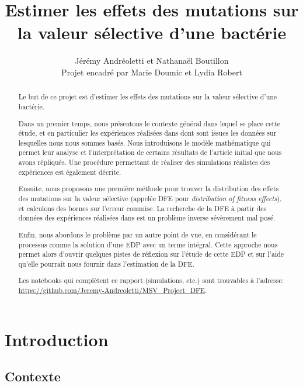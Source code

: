 \documentclass[12pt]{article}
\title{Estimer les effets des mutations sur la valeur sélective d'une bactérie}
\author{Jérémy Andréoletti et Nathanaël Boutillon\\Projet encadré par Marie Doumic et Lydia Robert}
\newcounter{prop}[section]
\begin{document}
\maketitle

\begin{abstract}
  Le but de ce projet est d'estimer les effets des mutations sur la valeur sélective d'une bactérie.

  Dans un premier temps, nous présentons le contexte général dans lequel se place cette étude, et en particulier les expériences réalisées dans \cite{rob} dont sont issues les données sur lesquelles nous nous sommes basés. Nous introduisons le modèle mathématique qui permet leur analyse et l'interprétation de certains résultats de l'article initial que nous avons répliqués. Une procédure permettant de réaliser des simulations réalistes des expériences est également décrite.

  Ensuite, nous proposons une première méthode pour trouver la distribution des effets des mutations sur la valeur sélective (appelée DFE pour \emph{distribution of fitness effects}), et calculons des bornes sur l'erreur commise. La recherche de la DFE à partir des données des expériences réalisées dans \cite{rob} est un problème inverse sévèrement mal posé.

  Enfin, nous abordons le problème par un autre point de vue, en considérant le processus comme la solution d'une EDP avec un terme intégral. Cette approche nous permet alors d'ouvrir quelques pistes de réflexion sur l'étude de cette EDP et sur l'aide qu'elle pourrait nous fournir dans l'estimation de la DFE.

  Les notebooks qui complètent ce rapport (simulations, etc.) sont trouvables à l'adresse: \url{https://github.com/Jeremy-Andreoletti/MSV_Project_DFE}.

\end{abstract}

\newpage

\tableofcontents

\newpage

\FloatBarrier
\section{Introduction}

\subsection{Contexte}
\end{document}
